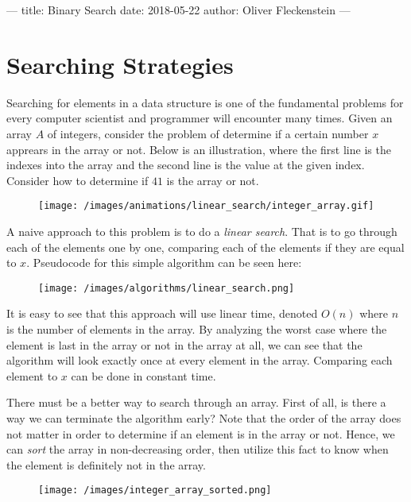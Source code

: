 ---
title: Binary Search
date: 2018-05-22
author: Oliver Fleckenstein
---
\chapter{Searching Strategies}

    Searching for elements in a data structure is one of the fundamental problems for every computer scientist and programmer will encounter many times.
    Given an array $A$ of integers, consider the problem of determine if a certain number $x$ apprears in the array or not.
    Below is an illustration, where the first line is the indexes into the array and the second line is the value at the given index.
    Consider how to determine if $41$ is the array or not.

    \begin{figure}[!h]
        \centering
        \texttt{[image: /images/animations/linear\_search/integer\_array.gif]}
    \end{figure}

    A naive approach to this problem is to do a \emph{linear search}.
    That is to go through each of the elements one by one, comparing each of the elements if they are equal to $x$.
    Pseudocode for this simple algorithm can be seen here:

    \begin{figure}[!h]
        \centering
        \texttt{[image: /images/algorithms/linear\_search.png]}
    \end{figure}

    It is easy to see that this approach will use linear time, denoted $O(n)$ where $n$ is the number of elements in the array.
    By analyzing the worst case where the element is last in the array or not in the array at all, we can see that the algorithm will look exactly once at every element in the array.
    Comparing each element to $x$ can be done in constant time.

    There must be a better way to search through an array.
    First of all, is there a way we can terminate the algorithm early?
    Note that the order of the array does not matter in order to determine if an element is in the array or not.
    Hence, we can \emph{sort} the array in non-decreasing order, then utilize this fact to know when the element is definitely not in the array.

    \begin{figure}[!h]
        \centering
        \texttt{[image: /images/integer\_array\_sorted.png]}
    \end{figure}

